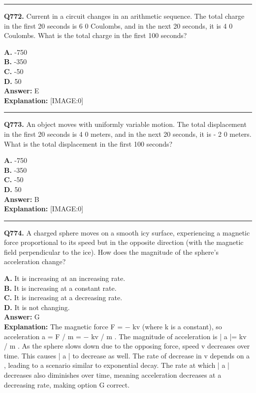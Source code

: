 \documentclass[12pt]{article}
\begin{document}
\hrule
\vspace{1em}


\noindent
\textbf{Q772.} Current in a circuit changes in an arithmetic sequence. The total charge in the first 20 seconds is
6
0 Coulombs, and in the next 20 seconds, it is
4
0 Coulombs. What is the total charge in the first 100 seconds?



\textbf{A.} -750 \\
\textbf{B.} -350 \\
\textbf{C.} -50 \\
\textbf{D.} 50 \\

\textbf{Answer:} E \\
\textbf{Explanation:} [IMAGE:0]

\hrule
\vspace{1em}


\noindent
\textbf{Q773.} An object moves with uniformly variable motion. The total displacement in the first 20 seconds is
4
0 meters, and in the next 20 seconds, it is -
2
0 meters. What is the total displacement in the first 100 seconds?



\textbf{A.} -750 \\
\textbf{B.} -350 \\
\textbf{C.} -50 \\
\textbf{D.} 50 \\

\textbf{Answer:} B \\
\textbf{Explanation:} [IMAGE:0]

\hrule
\vspace{1em}


\noindent
\textbf{Q774.} A charged sphere moves on a smooth icy surface, experiencing a magnetic force proportional to its speed but in the opposite direction (with the magnetic field perpendicular to the ice). How does the magnitude of the sphere’s acceleration change?



\textbf{A.} It is increasing at an increasing rate. \\
\textbf{B.} It is increasing at a constant rate. \\
\textbf{C.} It is increasing at a decreasing rate. \\
\textbf{D.} It is not changing. \\

\textbf{Answer:} G \\
\textbf{Explanation:} The magnetic force
F
=
−
kv
(where
k
is a constant), so acceleration
a
=
F
/
m
=
−
kv
/
m
. The magnitude of acceleration is |
a
|=
kv
/
m
. As the sphere slows down due to the opposing force, speed
v
decreases over time. This causes |
a
| to decrease as well. The rate of decrease in
v
depends on
a
, leading to a scenario similar to exponential decay. The rate at which |
a
| decreases also diminishes over time, meaning acceleration decreases at a decreasing rate, making option G correct.
\end{document}
